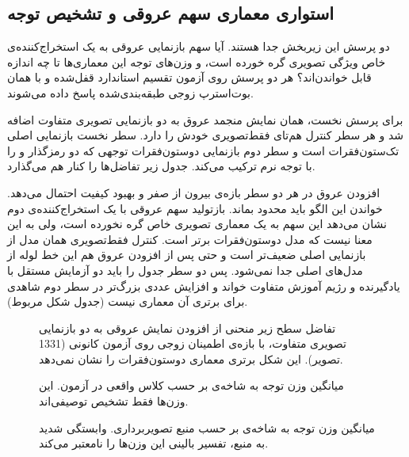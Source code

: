 \subsection{استواری معماری سهم عروقی و تشخیص توجه}

دو پرسش این زیربخش جدا هستند. آیا سهم بازنمایی عروقی به یک استخراج‌کننده‌ی خاص ویژگی تصویری گره خورده است، و وزن‌های توجه این معماری‌ها تا چه اندازه قابل خواندن‌اند؟ هر دو پرسش روی آزمون تقسیم استاندارد قفل‌شده و با همان بوت‌استرپ زوجی طبقه‌بندی‌شده پاسخ داده می‌شوند.

برای پرسش نخست، همان نمایش منجمد عروق به دو بازنمایی تصویری متفاوت اضافه شد و هر سطر کنترل هم‌تای فقط‌تصویری خودش را دارد. سطر نخست بازنمایی اصلی تک‌ستون‌فقرات  است و سطر دوم بازنمایی دو‌ستون‌فقرات توجهی که دو رمزگذار  و  را با توجه نرم ترکیب می‌کند. جدول زیر تفاضل‌ها را کنار هم می‌گذارد.



افزودن عروق در هر دو سطر بازه‌ی بیرون از صفر و بهبود کیفیت احتمال می‌دهد. خواندن این الگو باید محدود بماند. بازتولید سهم عروقی با یک استخراج‌کننده‌ی دوم نشان می‌دهد این سهم به یک معماری تصویری خاص گره نخورده است، ولی به این معنا نیست که مدل دو‌ستون‌فقرات برتر است. کنترل فقط‌تصویری همان مدل از بازنمایی اصلی ضعیف‌تر است و حتی پس از افزودن عروق هم این خط لوله از مدل‌های اصلی جدا نمی‌شود. پس دو سطر جدول را باید دو آزمایش مستقل با یادگیرنده و رژیم آموزش متفاوت خواند و افزایش عددی بزرگ‌تر در سطر دوم شاهدی برای برتری آن معماری نیست (جدول شکل مربوط).

\begin{figure}[htbp]
  \centering
  \caption{تفاضل سطح زیر منحنی از افزودن نمایش عروقی به دو بازنمایی تصویری متفاوت، با بازه‌ی اطمینان زوجی روی آزمون کانونی (1331 تصویر). این شکل برتری معماری دو‌ستون‌فقرات را نشان نمی‌دهد.}
  \label{fig:U21}
\end{figure}

\begin{figure}[htbp]
  \centering
  \caption{میانگین وزن توجه به شاخه‌ی  بر حسب کلاس واقعی در آزمون. این وزن‌ها فقط تشخیص توصیفی‌اند.}
  \label{fig:U22}
\end{figure}

\begin{figure}[htbp]
  \centering
  \caption{میانگین وزن توجه به شاخه‌ی  بر حسب منبع تصویربرداری. وابستگی شدید به منبع، تفسیر بالینی این وزن‌ها را نامعتبر می‌کند.}
  \label{fig:U23}
\end{figure}

